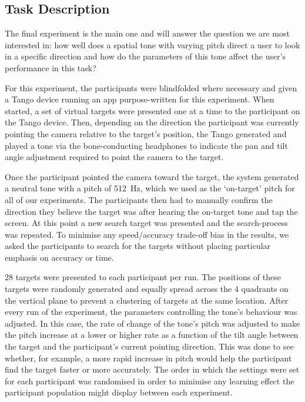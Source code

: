 \documentclass[sigconf, review=true, screen=true, anonymous=true]{acmart}
\begin{document}

\subsection{Task Description}

The final experiment is the main one and will answer the question we are most interested in: how well does a spatial tone with varying pitch direct a user to look in a specific direction and how do the parameters of this tone affect the user's performance in this task? 

For this experiment, the participants were blindfolded where necessary and given a Tango device running an app purpose-written for this experiment.
When started, a set of virtual targets were presented one at a time to the participant on the Tango device.
Then, depending on the direction the participant was currently pointing the camera relative to the target's position, the Tango generated and played a tone via the bone-conducting headphones to indicate the pan and tilt angle adjustment required to point the camera to the target. %

Once the participant pointed the camera toward the target, the system generated a neutral tone with a pitch of \SI{512}{\hertz}, which we used as the `on-target' pitch for all of our experiments.
The participants then had to manually confirm the direction they believe the target was after hearing the on-target tone and tap the screen.
At this point a new search target was presented and the search-process was repeated.
To minimise any speed/accuracy trade-off bias in the results, we asked the participants to search for the targets without placing particular emphasis on accuracy or time. 

28 targets were presented to each participant per run.
The positions of these targets were randomly generated and equally spread across the 4 quadrants on the vertical plane to prevent a clustering of targets at the same location.
After every run of the experiment, the parameters controlling the tone's behaviour was adjusted.
In this case, the rate of change of the tone's pitch was adjusted to make the pitch increase at a lower or higher rate as a function of the tilt angle between the target and the participant's current pointing direction.
This was done to see whether, for example, a more rapid increase in pitch would help the participant find the target faster or more accurately.
The order in which the settings were set for each participant was randomised in order to minimise any learning effect the participant population might display between each experiment. 
\end{document}
